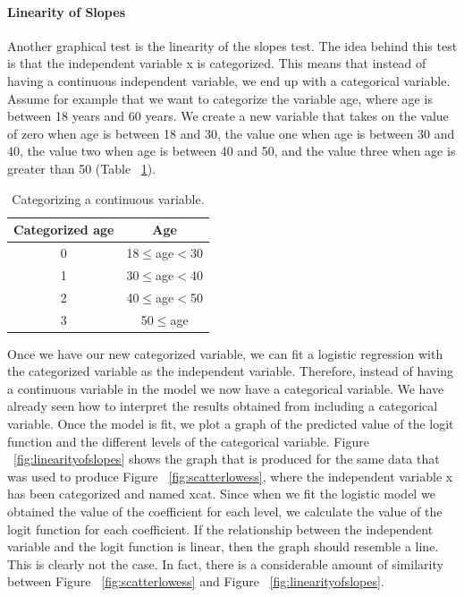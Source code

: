\documentclass[a4paper,12pt,oneside]{book}
\begin{document}
\paragraph{Linearity of Slopes} 
Another graphical test is the linearity of the slopes test. The idea behind this test is that the independent variable x is categorized. This means that instead of having a continuous independent variable, we end up 
with a categorical variable. Assume for example that we want to categorize the variable age, where age is between 18 years and 60 years. We create a new variable that takes on the value of zero when age is between 18 and 
30, the value one when age is between 30 and 40, the value two when age is between 40 and 50, and the value three when age is greater than 50 (Table ~\ref{table:categorize}). 
\begin{table}[h!t]
	\caption{Categorizing a continuous variable.} \label{table:categorize}
	\centering
	\begin{tabular}{c c}
	\hline
	\bf Categorized age & \bf Age \\
	\hline 
	0 & 18$\leq$age$<$30 \\
	1 & 30$\leq$age$<$40 \\
	2 & 40$\leq$age$<$50 \\
	3 & 50$\leq$age \\
	\hline
	\end{tabular}
\end{table} 
Once we have our new categorized variable, we can fit a logistic regression with the categorized variable as the independent variable. Therefore, instead of having a continuous variable in the model we now have a categorical 
variable. We have already seen how to interpret the results obtained from including a categorical variable. Once the model is fit, we plot a graph of the predicted value of the logit function and the different levels of 
the categorical variable. Figure ~\ref{fig:linearityofslopes} shows the graph that is produced for the same data that was used to produce Figure ~\ref{fig:scatterlowess}, where the independent variable x has been categorized and named xcat. Since when we fit the logistic 
model we obtained the value of the coefficient for each level, we calculate the value of the logit function for each coefficient. If the relationship between the independent variable and the logit function is linear, 
then the graph should resemble a line. This is clearly not the case. In fact, there is a considerable amount of similarity between Figure ~\ref{fig:scatterlowess} and Figure ~\ref{fig:linearityofslopes}. 
\end{document}

